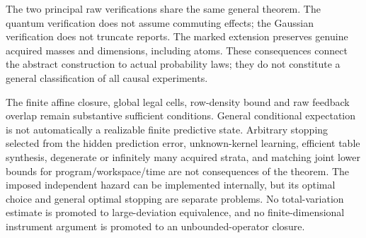 The two principal raw verifications share the same general theorem. The quantum verification does not assume commuting effects; the Gaussian verification does not truncate reports. The marked extension preserves genuine acquired masses and dimensions, including atoms. These consequences connect the abstract construction to actual probability laws; they do not constitute a general classification of all causal experiments.

The finite affine closure, global legal cells, row-density bound and raw feedback overlap remain substantive sufficient conditions. General conditional expectation is not automatically a realizable finite predictive state. Arbitrary stopping selected from the hidden prediction error, unknown-kernel learning, efficient table synthesis, degenerate or infinitely many acquired strata, and matching joint lower bounds for program/workspace/time are not consequences of the theorem. The imposed independent hazard can be implemented internally, but its optimal choice and general optimal stopping are separate problems. No total-variation estimate is promoted to large-deviation equivalence, and no finite-dimensional instrument argument is promoted to an unbounded-operator closure.
